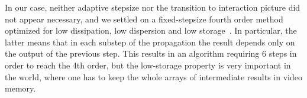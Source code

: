 In our case, neither adaptive stepsize nor the transition to interaction picture did not appear necessary, and we settled on a fixed-stepsize fourth order  method optimized for low dissipation, low dispersion and low storage~\cite{Berland2006}.
In particular, the latter means that in each substep of the  propagation the result depends only on the output of the previous step.
This results in an algorithm requiring 6 steps in order to reach the 4th order, but the low-storage property is very important in the  world, where one has to keep the whole arrays of intermediate results in video memory.
